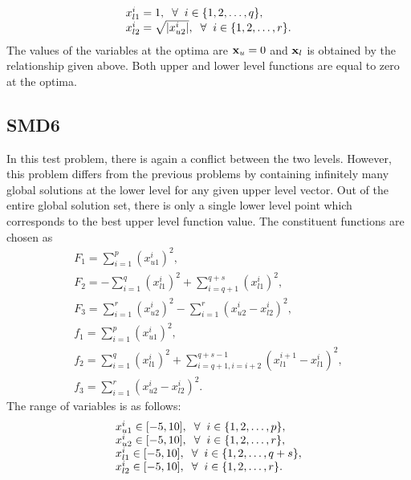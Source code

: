 \documentclass[twoside]{article}
\begin{document}
\begin{equation}
\begin{array}{l}
x_{l1}^{i} = 1, \hspace{2mm} \forall \hspace{2mm} i \in \{1,2,\ldots,q\},\\
x_{l2}^{i} = \sqrt{|x_{u2}^{i}|}, \hspace{2mm} \forall \hspace{2mm} i \in \{1,2,\ldots,r\}.
\end{array}
\end{equation}
The values of the variables at the optima are $\mbox{$\mathbf{x}$}_u=0$ and $\mbox{$\mathbf{x}$}_l$ is obtained by the relationship given above. Both upper and
lower level functions are equal to zero at the optima.

\subsection{SMD6}
In this test problem, there is again a conflict between the two levels. However, this problem differs from the previous problems by containing infinitely many global solutions at the lower level for any given upper level vector. Out of the entire global solution set, there is only a single lower level point which corresponds to the best upper level function value. The constituent functions are chosen as
\begin{equation}
\begin{array}{l}
F_1 = \sum_{i=1}^{p} (x_{u1}^{i})^2,\\
F_2 = - \sum_{i=1}^{q} (x_{l1}^{i})^2 + \sum_{i=q+1}^{q+s} (x_{l1}^{i})^2,\\
F_3 = \sum_{i=1}^{r} (x_{u2}^{i})^2 - \sum_{i=1}^{r} (x_{u2}^{i} - x_{l2}^{i})^2,\\
f_1 = \sum_{i=1}^{p} (x_{u1}^{i})^2,\\
f_2 = \sum_{i=1}^{q} (x_{l1}^{i})^2 + \sum_{i=q+1, i=i+2}^{q+s-1} (x_{l1}^{i+1} - x_{l1}^{i})^2,\\
f_3 = \sum_{i=1}^{r} (x_{u2}^{i} - x_{l2}^{i})^2.
\end{array}
\end{equation}
The range of variables is as follows:
\begin{equation}
\begin{array}{l}
x_{u1}^{i} \in [-5,10], \hspace{2mm} \forall \hspace{2mm} i \in \{1,2,\ldots,p\},\\
x_{u2}^{i} \in [-5,10], \hspace{2mm} \forall \hspace{2mm} i \in \{1,2,\ldots,r\},\\
x_{l1}^{i} \in [-5,10], \hspace{2mm} \forall \hspace{2mm} i \in \{1,2,\ldots,q+s\},\\
x_{l2}^{i} \in [-5,10], \hspace{2mm} \forall \hspace{2mm} i \in \{1,2,\ldots,r\}.
\end{array}
\end{equation}
\end{document}
